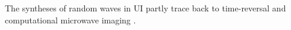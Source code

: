 The syntheses of
random waves in
\ac{UI} partly trace back to
time-reversal
\cite{article:MontaldoITUFFC2005} and
computational microwave imaging
\cite{article:FromentezeOptExp2017,article:GollubSciRep2017,article:FromentezeApplPhysLett2015,article:LipworthJOSAA2013,article:HuntScience2013}.
